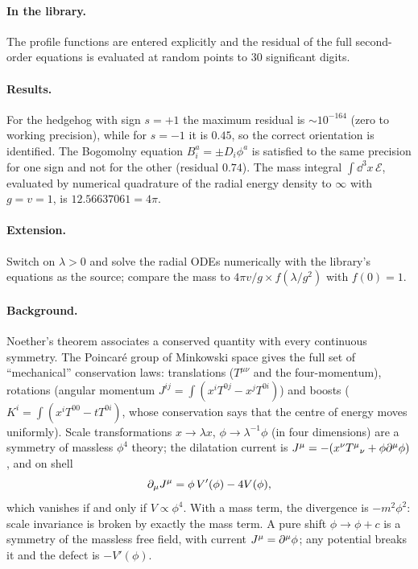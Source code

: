 \paragraph{In the library.} The profile functions are entered explicitly and the residual of the full second-order equations is evaluated at random points to $30$ significant digits.


\paragraph{Results.} For the hedgehog with sign $s=+1$ the maximum residual is $\sim10^{-164}$ (zero to working precision), while for $s=-1$ it is $0.45$, so the correct orientation is identified. The Bogomolny equation $B^a_i=\pm D_i\phi^a$ is satisfied to the same precision for one sign and not for the other (residual $0.74$). The mass integral $\int\dd^3x\,\mathcal E$, evaluated by numerical quadrature of the radial energy density to $\infty$ with $g=v=1$, is $12.56637061=4\pi$.

\paragraph{Extension.} Switch on $\lambda>0$ and solve the radial ODEs numerically with the library's equations as the source; compare the mass to $4\pi v/g\times f(\lambda/g^2)$ with $f(0)=1$.


\paragraph{Background.} Noether's theorem \cite{Noether1918} associates a conserved quantity with every continuous symmetry. The Poincar\'e group of Minkowski space gives the full set of ``mechanical'' conservation laws: translations ($T^{\mu\nu}$ and the four-momentum), rotations (angular momentum $J^{ij}=\int(x^iT^{0j}-x^jT^{0i})$) and boosts ($K^i=\int(x^iT^{00}-tT^{0i})$, whose conservation says that the centre of energy moves uniformly). Scale transformations $x\to\lambda x$, $\phi\to\lambda^{-1}\phi$ (in four dimensions) are a symmetry of massless $\phi^4$ theory; the dilatation current is $J^\mu=-(x^\nu T^\mu{}_\nu+\phi\partial^\mu\phi)$, and on shell
\begin{equation}
\partial_\mu J^\mu=\phi\,V'(\phi)-4V(\phi),
\end{equation}
which vanishes if and only if $V\propto\phi^4$. With a mass term, the divergence is $-m^2\phi^2$: scale invariance is broken by exactly the mass term. A pure shift $\phi\to\phi+c$ is a symmetry of the massless free field, with current $J^\mu=\partial^\mu\phi$; any potential breaks it and the defect is $-V'(\phi)$.

